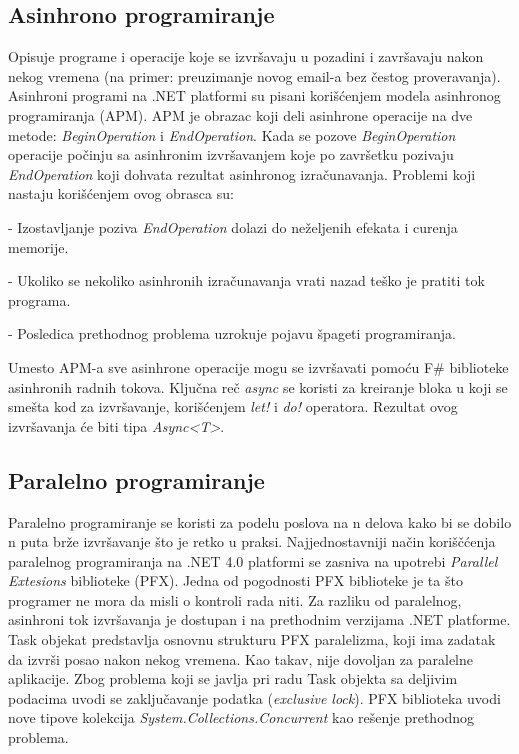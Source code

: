 \documentclass[a4paper]{article}
\begin{document}
\subsection{Asinhrono programiranje} 
Opisuje programe i operacije koje se izvršavaju u pozadini i završavaju nakon nekog vremena (na primer: preuzimanje novog email-a bez čestog proveravanja). Asinhroni programi na .NET platformi su pisani korišćenjem modela asinhronog programiranja (APM). APM je obrazac koji deli asinhrone operacije na dve metode: {\em BeginOperation} i {\em EndOperation}. Kada se pozove {\em BeginOperation} operacije počinju sa asinhronim izvršavanjem koje po završetku pozivaju {\em EndOperation} koji dohvata rezultat asinhronog izračunavanja. Problemi koji nastaju korišćenjem ovog obrasca su: 

	- Izostavljanje poziva {\em EndOperation} dolazi do neželjenih efekata i curenja memorije. 
 
	- Ukoliko se nekoliko asinhronih izračunavanja vrati nazad teško je pratiti tok programa.
	
	- Posledica prethodnog problema uzrokuje pojavu špageti programiranja.

Umesto APM-a sve asinhrone operacije mogu se izvršavati pomoću F\# biblioteke asinhronih radnih tokova\cite{workFlow}. Ključna reč {\em async} se koristi za kreiranje bloka u koji se smešta kod za izvršavanje, korišćenjem {\em let!} i {\em do!} operatora. Rezultat ovog izvršavanja će biti tipa {\em Async<T>}\cite{theAL}.

\subsection{Paralelno programiranje}

Paralelno programiranje se koristi za podelu poslova na n delova kako bi se dobilo n puta brže izvršavanje što je retko u praksi. Najjednostavniji način koriščćenja paralelnog programiranja na .NET 4.0 platformi se zasniva na upotrebi {\em Parallel Extesions} biblioteke (PFX)\cite{progFsPFX}. Jedna od pogodnosti PFX biblioteke je ta što programer ne mora da misli o kontroli rada niti. Za razliku od paralelnog, asinhroni tok izvršavanja je dostupan i na prethodnim verzijama .NET platforme. Task objekat predstavlja osnovnu strukturu PFX paralelizma, koji ima zadatak da izvrši posao nakon nekog vremena. Kao takav, nije dovoljan za paralelne aplikacije. Zbog problema koji se javlja pri radu Task objekta sa deljivim podacima uvodi se zaključavanje podatka ({\em exclusive lock}). PFX biblioteka uvodi nove tipove kolekcija {\em System.Collections.Concurrent} \cite{sysCC} kao rešenje prethodnog problema.  
\end{document}
